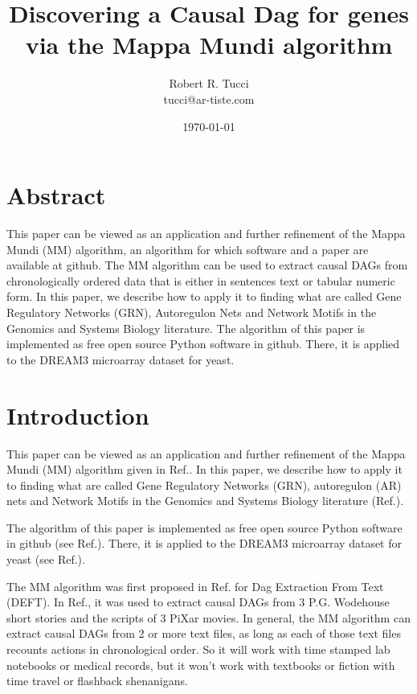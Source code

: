 \documentclass[12pt]{article}
\begin{document}
\title{Discovering a Causal Dag for genes \\ via the Mappa Mundi algorithm}
\date{ \today}
\author{Robert R. Tucci\\
        tucci@ar-tiste.com}
\maketitle
\vskip2cm
\section*{Abstract}
This paper can be viewed
as an application and further refinement 
of the Mappa Mundi (MM) algorithm,
an algorithm  for which software and a paper are available at github. 
The MM algorithm can be used to extract
causal DAGs from chronologically ordered data that is either in sentences text or tabular numeric form. 
In this paper, we 
describe how to apply it to finding what
are called Gene Regulatory Networks (GRN),
Autoregulon  Nets
and Network Motifs 
in the Genomics and Systems Biology literature.
The algorithm of this paper is implemented as free open source Python software in github. There, it is applied to the DREAM3 microarray 
dataset for yeast.

\section{Introduction}

This paper can be viewed
as an application and further refinement 
of the Mappa Mundi (MM) algorithm given in Ref.\cite{mappa-mundi}.  
In this paper, we 
describe how to apply it to finding what
are called Gene Regulatory Networks (GRN),
autoregulon (AR) nets
and Network Motifs 
in the Genomics and Systems Biology literature (Ref.\cite{alon-book}).

The algorithm of this paper is implemented as free open source Python software in github
(see Ref.\cite{gcmap}). There, it is applied to the DREAM3 microarray 
dataset for yeast (see Ref.\cite{dream3}).



The MM algorithm
was first proposed in Ref.\cite{mappa-mundi} 
for Dag Extraction From Text (DEFT).
In Ref.\cite{mappa-mundi}, it was used to 
extract causal DAGs from 3 P.G. Wodehouse short stories and the scripts of 3 PiXar movies.
In general, the MM algorithm can extract causal DAGs from 2 or more 
text files, as long as each of
those text files recounts actions 
in chronological order. So it will work with time stamped lab
notebooks or medical records, 
but it won't work with textbooks or fiction with  time travel or flashback shenanigans.
\end{document}
